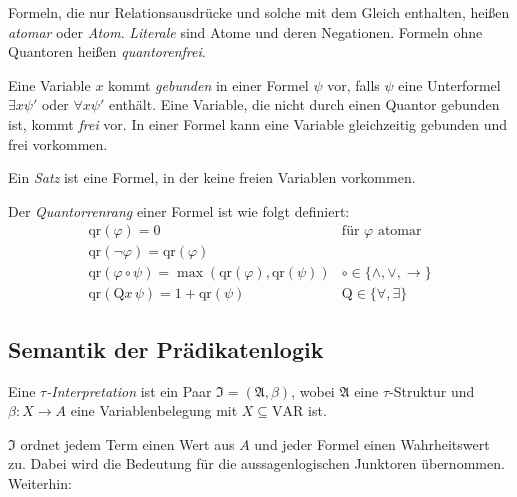 \documentclass{panikzettel}
\newcommand{\J}{\mathfrak{I}}
\newcommand{\A}{\mathfrak{A}}
\newcommand{\VAR}{\mathrm{VAR}}
\newcommand{\qr}{\mathrm{qr}}
\begin{document}
Formeln, die nur Relationsausdrücke und solche mit dem Gleich enthalten, heißen \emph{atomar} oder \emph{Atom}. \emph{Literale} sind Atome und deren Negationen. Formeln ohne Quantoren heißen \emph{quantorenfrei}.

Eine Variable $x$ kommt \emph{gebunden} in einer Formel $\psi$ vor, falls $\psi$ eine Unterformel $\exists x \psi'$ oder $\forall x \psi'$ enthält. Eine Variable, die nicht durch einen Quantor gebunden ist, kommt \emph{frei} vor. In einer Formel kann eine Variable gleichzeitig gebunden und frei vorkommen.

Ein \emph{Satz} ist eine Formel, in der keine freien Variablen vorkommen.

Der \emph{Quantorrenrang} einer Formel ist wie folgt definiert:
\[\begin{array}{cc}
\qr(\varphi) = 0 & \text{für $\varphi$ atomar}  \\
\qr(\neg \varphi) = \qr(\varphi)    \\
\qr(\varphi \circ \psi) = \max(\qr(\varphi), \qr(\psi)) &   \circ \in \{\land, \lor, \to\}  \\
\qr(\mathrm{Q}x\,\psi) = 1 + \qr(\psi) & \mathrm{Q} \in \{\forall, \exists\}
\end{array}\]

\subsection{Semantik der Prädikatenlogik}

Eine \emph{$\tau$-Interpretation} ist ein Paar $\J = (\A, \beta)$, wobei $\A$ eine $\tau$-Struktur und $\beta : X \to A$ eine Variablenbelegung mit $X \subseteq \VAR$ ist.

$\J$ ordnet jedem Term einen Wert aus $A$ und jeder Formel einen Wahrheitswert zu. Dabei wird die Bedeutung für die aussagenlogischen Junktoren übernommen. Weiterhin:
\end{document}
